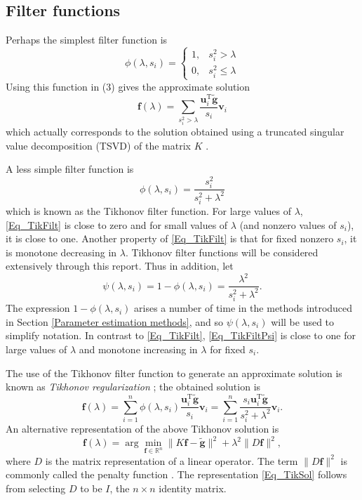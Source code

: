 \documentclass[12pt]{article}
\newcommand{\gnoise}{\widetilde{\mathbf{g}}}
\newcommand{\kmat}{K}	%
\newcommand{\fdis}{\mathbf{f}}
\newcommand{\trans}{\mathrm{T}}	%
\newcommand{\regparam}{\lambda}
\newcommand{\filt}{\phi}
\newcommand{\mfilt}{\psi}
\newcommand{\singular}{s}	%
\newcommand{\LSV}{\mathbf{u}}	%
\newcommand{\RSV}{\mathbf{v}}	%
\begin{document}
\subsection{Filter functions} \label{Filer functions}
Perhaps the simplest filter function is
\[\filt(\regparam,\singular_i) = \begin{cases}
1, & \singular_i^2 > \regparam \\
0, & \singular_i^2 \leq \regparam
\end{cases}\]
Using this function in (3) gives the approximate solution
\[\fdis(\regparam) = \sum_{\singular_i^2 > \regparam} \frac{{\LSV^\trans_i}\gnoise}{\singular_i}\RSV_i\]
which actually corresponds to the solution obtained using a truncated singular value decomposition (TSVD) of the matrix $\kmat$ \cite{Vogel:2002}. \par
A less simple filter function is
\begin{equation}
\filt(\regparam,\singular_i)  = \frac{\singular_i^2}{\singular_i^2 + \regparam^2}
\label{Eq_TikFilt}
\end{equation}
which is known as the Tikhonov filter function. For large values of $\regparam$, \eqref{Eq_TikFilt} is close to zero and for small values of $\regparam$ (and nonzero values of $\singular_i$), it is close to one. Another property of \eqref{Eq_TikFilt} is that for fixed nonzero $\singular_i$, it is monotone decreasing in $\regparam$. Tikhonov filter functions will be considered extensively through this report. Thus in addition, let
\begin{equation}
\mfilt(\regparam,\singular_i) = 1 - \filt(\regparam,\singular_i) = \frac{\regparam^2}{\singular_i^2 + \regparam^2}.
\label{Eq_TikFiltPsi}
\end{equation}
The expression $1 - \filt(\regparam,\singular_i)$ arises a number of time in the methods introduced in Section \ref{Parameter estimation methods}, and so $\mfilt(\regparam,\singular_i)$ will be used to simplify notation. In contrast to \eqref{Eq_TikFilt}, \eqref{Eq_TikFiltPsi} is close to one for large values of $\regparam$ and monotone increasing in $\regparam$ for fixed $\singular_i$. \par 
The use of the Tikhonov filter function to generate an approximate solution is known as \textit{Tikhonov regularization} \cite{Tikh1963}; the obtained solution is
\begin{equation}
\fdis(\regparam) = \sum_{i = 1}^n \filt(\regparam,\singular_i)\frac{{\LSV^\trans_i}\gnoise}{\singular_i}\RSV_i = \sum_{i = 1}^n \frac{\singular_i{\LSV^\trans_i}\gnoise}{\singular_i^2 + \regparam^2}\RSV_i.
\label{Eq_TikSol}
\end{equation}
An alternative representation of the above Tikhonov solution is
\begin{equation}
\fdis(\regparam) = \arg\min_{\fdis \in \mathbb{R}^n} \|\kmat\fdis - \gnoise\|^2 + \regparam^2\|D\fdis\|^2,
\end{equation}
where $D$ is the matrix representation of a linear operator. The term $\|D\fdis\|^2$ is commonly called the penalty function \cite{Vogel:2002}. The representation \eqref{Eq_TikSol} follows from selecting $D$ to be $I$, the $n \times n$ identity matrix. 
\end{document}
